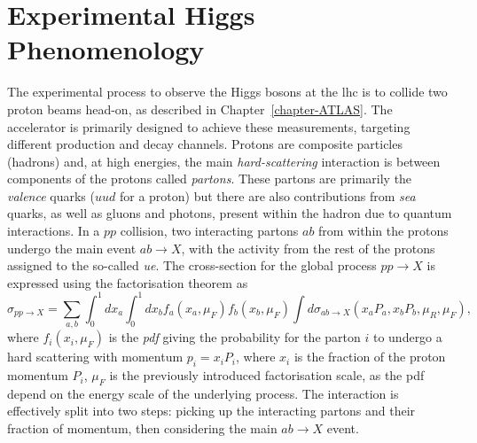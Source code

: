 \section{Experimental Higgs Phenomenology}
The experimental process to observe the Higgs bosons at the \gls{lhc} is to collide two proton beams head-on, as described in Chapter~\ref{chapter-ATLAS}. The accelerator is primarily designed to achieve these measurements, targeting different production and decay channels. Protons are composite particles (hadrons) and, at high energies, the main \textit{hard-scattering} interaction is between components of the protons called \textit{partons}. These partons are primarily the \textit{valence} quarks ($uud$ for a proton) but there are also contributions from \textit{sea} quarks, as well as gluons and photons, present within the hadron due to quantum interactions. In a $pp$ collision, two interacting partons $ab$ from within the protons undergo the main event $ab \rightarrow X$, with the activity from the rest of the protons assigned to the so-called \textit{\gls{ue}}. The cross-section for the global process $pp \rightarrow X$ is expressed using the factorisation theorem \cite{collins2004factorization} as 
\begin{equation}
\sigma_{pp\rightarrow X} = \sum_{a,b} \int_0^1 dx_a \int_0^1 dx_b f_a(x_a, \mu_F) f_b(x_b, \mu_F) \int d\sigma_{ab\rightarrow X}\left(x_aP_a, x_bP_b, \mu_R, \mu_F \right),
\end{equation}
where $f_i(x_i, \mu_F)$ is the \textit{\gls{pdf}} giving the probability for the parton $i$ to undergo a hard scattering with momentum $p_i = x_i P_i$, where $x_i$ is the fraction of the proton momentum $P_i$, $\mu_F$ is the previously introduced factorisation scale, as the \gls{pdf} depend on the energy scale of the underlying process. The interaction is effectively split into two steps: picking up the interacting partons and their fraction of momentum, then considering the main $ab \rightarrow X$ event.\\

